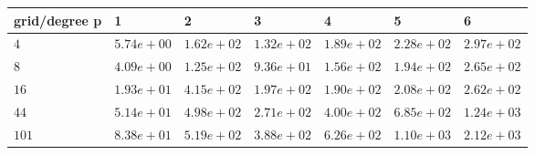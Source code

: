 \begin{tabular}{lllllll}
\hline
 grid/degree p   & 1          & 2          & 3          & 4          & 5          & 6          \\
\hline
 $4$             & $5.74e+00$ & $1.62e+02$ & $1.32e+02$ & $1.89e+02$ & $2.28e+02$ & $2.97e+02$ \\
 $8$             & $4.09e+00$ & $1.25e+02$ & $9.36e+01$ & $1.56e+02$ & $1.94e+02$ & $2.65e+02$ \\
 $16$            & $1.93e+01$ & $4.15e+02$ & $1.97e+02$ & $1.90e+02$ & $2.08e+02$ & $2.62e+02$ \\
 $44$            & $5.14e+01$ & $4.98e+02$ & $2.71e+02$ & $4.00e+02$ & $6.85e+02$ & $1.24e+03$ \\
 $101$           & $8.38e+01$ & $5.19e+02$ & $3.88e+02$ & $6.26e+02$ & $1.10e+03$ & $2.12e+03$ \\
\hline
\end{tabular}